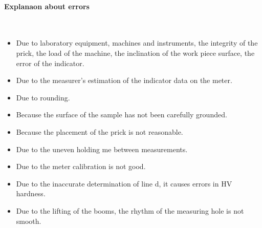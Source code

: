 \paragraph{Explanaon about errors} $ $
\begin{itemize}
	\item Due to laboratory equipment, machines and instruments, the integrity of the prick, the load of the machine, the inclination of the work piece surface, the error of the indicator.
	\item Due to the measurer's estimation of the indicator data on the meter.
	\item Due to rounding.
	\item Because the surface of the sample has not been carefully grounded.
	\item Because the placement of the prick is not reasonable.
	\item Due to the uneven holding me between measurements.
	\item Due to the meter calibration is not good.
	\item Due to the inaccurate determination of line d, it causes errors in HV hardness.
	\item Due to the lifting of the booms, the rhythm of the measuring hole is not smooth.
\end{itemize}